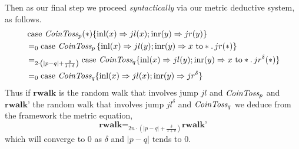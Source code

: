 \begin{example}
Then as our final step we proceed
        \emph{syntactically} via our metric deductive system, as follows.
        \begin{align*}
               &\, \text{case } \emph{CoinToss}_p (*)  \{ \mathrm{inl}(x) \Rightarrow jl(x) ; 
               \mathrm{inr}(y) \Rightarrow jr(y) \}
               \\
               & =_0
               \text{case } \emph{CoinToss}_p \, \{ \mathrm{inl}(x) \Rightarrow
               jl(y) 
               ; 
               \mathrm{inr}(y) \Rightarrow  x \text{ to} 
               \ast. \, jr(\ast) \}
               \\
               & =_{2 \cdot \left(|p-q|+ \frac{\delta}{1 + \delta}\right)}
               \text{case } \emph{CoinToss}_q  \{ \mathrm{inl}(x) \Rightarrow 
               jl(y); 
               \mathrm{inr}(y) \Rightarrow  x \text{ to} 
               \ast. \, jr^{\delta}(\ast) \}
               \\
               & =_0
               \text{case } \emph{CoinToss}_q \{  \mathrm{inl}(x) \Rightarrow jl(x) 
               ; 
               \mathrm{inr}(y) \Rightarrow jr^{\delta}  \}
        \end{align*}
        Thus if $\textbf{rwalk}$ is the random walk that
        involves jump $jl$ and $ \emph{CoinToss}_p$  and $\textbf{rwalk'}$ the random
        walk that involves jump $jl^\delta$ and $ \emph{CoinToss}_q$ we deduce from the framework the metric
        equation,
        \[
                \textbf{rwalk} =_{2n \cdot \left(|p-q|+ \frac{\delta}{1 + \delta}\right)}
                \textbf{rwalk'} 
        \]
        which will converge to $0$ as $\delta$ and $|p-q|$ tends to $0$.


\end{example}
